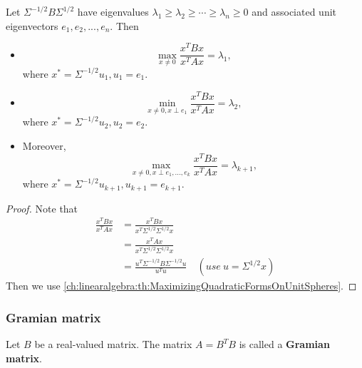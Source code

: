 \begin{refsection}
\begin{corollary}
	Let $\Sigma^{-1/2}B\Sigma^{1/2}$ have eigenvalues $\lambda_1\geq\lambda_2\geq \cdots\geq \lambda_n \geq 0$ and associated unit eigenvectors $e_1,e_2,...,e_n$. Then
	\begin{itemize}
		\item $$\max_{x\neq 0} \frac{x^TBx}{x^TAx} = \lambda_1,$$
		where $x^*= \Sigma^{-1/2}u_1, u_1 = e_1$.
		\item $$\min_{x\neq 0, x\perp e_1} \frac{x^TBx}{x^TAx} = \lambda_2,$$
		where $x^*= \Sigma^{-1/2}u_2, u_2 = e_2$.
		\item Moreover, $$\max_{x\neq 0, x\perp e_1,...,e_k} \frac{x^TBx}{x^TAx} = \lambda_{k+1},$$
		where $x^*= \Sigma^{-1/2} u_{k+1}, u_{k+1} = e_{k+1}$.
	\end{itemize}
\end{corollary}
\begin{proof}
 Note that	
\begin{align*}
\frac{x^TBx}{x^TAx} &= \frac{x^TBx}{x^T\Sigma^{1/2}\Sigma^{1/2}x} \\
&= \frac{x^TAx}{x^T\Sigma^{1/2}\Sigma^{1/2}x} \\
&= \frac{u^T\Sigma^{-1/2}B\Sigma^{-1/2}u}{u^Tu} \quad(use~u = \Sigma^{1/2}x) 
\end{align*}
Then we use \autoref{ch:linearalgebra:th:MaximizingQuadraticFormsOnUnitSpheres}.
\end{proof}


\subsubsection{Gramian matrix}

\begin{definition}
Let $B$ be a real-valued matrix. The matrix $A = B^TB$ is called a \textbf{Gramian matrix}.	
\end{definition}


\end{refsection}
